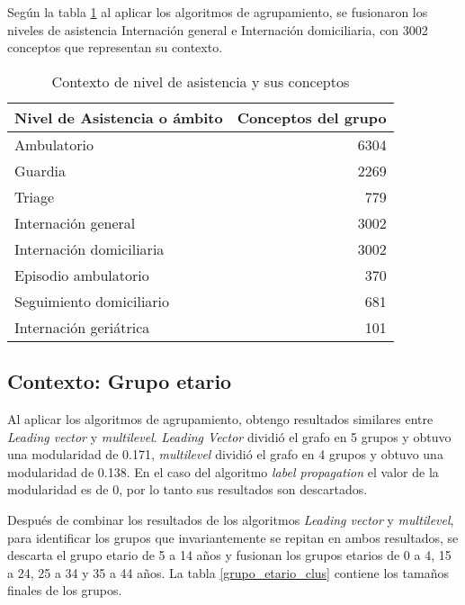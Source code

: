 Según la tabla \ref{nivel_asistencia_clus} al aplicar los algoritmos de agrupamiento, se fusionaron los niveles de asistencia Internación general e Internación domiciliaria, con 3002 conceptos que representan su contexto.

\begin{table}[htb]
\centering
\caption{Contexto de nivel de asistencia y sus conceptos }
\label{nivel_asistencia_clus}
\begin{tabular}{@{}lr@{}}
\toprule
Nivel de Asistencia o ámbito & Conceptos del grupo \\ \midrule
Ambulatorio & \num{6304} \\
Guardia & \num{2269} \\
Triage & \num{779} \\
Internación general & \num{3002} \\
Internación domiciliaria  & \num{3002}\\
Episodio ambulatorio & \num{370} \\
Seguimiento domiciliario & \num{681}\\
Internación geriátrica & \num{101} \\ \bottomrule
\end{tabular}
\end{table}


\subsection{Contexto: Grupo etario}
Al aplicar los algoritmos de agrupamiento, obtengo resultados similares entre \textit{Leading vector} y \textit{multilevel}. \textit{Leading Vector} dividió el grafo en 5 grupos y obtuvo una modularidad de \num{0.171}, \textit{multilevel} dividió el grafo en 4 grupos y obtuvo una modularidad de \num{0.138}. En el caso del algoritmo \textit{label propagation} el valor de la modularidad es de 0, por lo tanto sus resultados son descartados.

Después de combinar los resultados de los algoritmos \textit{Leading vector} y \textit{multilevel}, para identificar los grupos que invariantemente se repitan en ambos resultados, se descarta el grupo etario de 5 a 14 años y fusionan los grupos etarios de 0 a 4, 15 a 24, 25 a 34 y 35 a 44 años. La tabla \ref{grupo_etario_clus} contiene los tamaños finales de los grupos.



